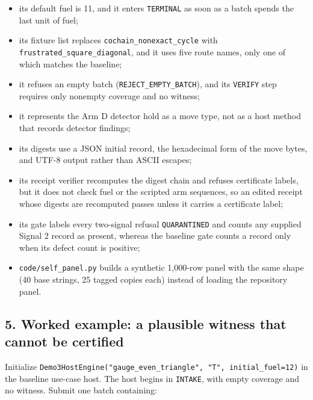 \documentclass[
  11pt,
]{article}
\newcommand{\passthrough}[1]{#1}
\providecommand{\tightlist}{%
  \setlength{\itemsep}{0pt}\setlength{\parskip}{0pt}}
\begin{document}
\begin{itemize}
\tightlist
\item
  its default fuel is 11, and it enters
  \passthrough{\lstinline!TERMINAL!} as soon as a batch spends the last
  unit of fuel;
\item
  its fixture list replaces
  \texttt{\nolinkurl{cochain_nonexact_cycle}} with
  \texttt{\nolinkurl{frustrated_square_diagonal}}, and it uses
  five route names, only one of which matches the baseline;
\item
  it refuses an empty batch
  (\texttt{\nolinkurl{REJECT_EMPTY_BATCH}}), and its
  \passthrough{\lstinline!VERIFY!} step requires only nonempty coverage
  and no witness;
\item
  it represents the Arm D detector hold as a move type, not as a host
  method that records detector findings;
\item
  its digests use a JSON initial record, the hexadecimal form of the
  move bytes, and UTF-8 output rather than ASCII escapes;
\item
  its receipt verifier recomputes the digest chain and refuses
  certificate labels, but it does not check fuel or the scripted arm
  sequences, so an edited receipt whose digests are recomputed passes
  unless it carries a certificate label;
\item
  its gate labels every two-signal refusal
  \passthrough{\lstinline!QUARANTINED!} and counts any supplied Signal 2
  record as present, whereas the baseline gate counts a record only when
  its defect count is positive;
\item
  \texttt{\nolinkurl{code/self_panel.py}} builds a synthetic
  1,000-row panel with the same shape (40 base strings, 25 tagged copies
  each) instead of loading the repository panel.
\end{itemize}

\hypertarget{worked-example-a-plausible-witness-that-cannot-be-certified}{%
\subsection{5. Worked example: a plausible witness that cannot be
certified}\label{worked-example-a-plausible-witness-that-cannot-be-certified}}

Initialize
\texttt{Demo3HostEngine("gauge\_even\_triangle", "T", initial\_fuel=12)}
in the baseline use-case host. The host begins in
\passthrough{\lstinline!INTAKE!}, with empty coverage and no witness.
Submit one batch containing:
\end{document}
